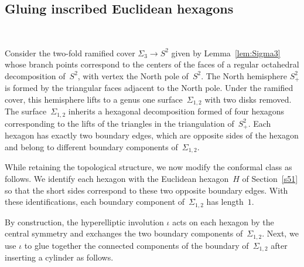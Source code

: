 \documentclass[12pt,reqno]{amsart}
\theoremstyle{definition}
\numberwithin{equation}{section}
\numberwithin{equation}{section}
\begin{document}
\subsection{Gluing inscribed Euclidean hexagons}
\label{s53}

\mbox{ } \medskip



Consider the two-fold ramified cover $\Sigma_3 \to S^2$ given by Lemma~\ref{lem:Sigma3} whose branch points correspond to the centers of the faces of a regular octahedral decomposition of~$S^2$, with vertex the North pole of~$S^2$.
The North hemisphere $S^2_+$ is formed by the triangular faces adjacent
to the North pole.  Under the ramified cover, this hemisphere lifts to a genus
one surface~$\Sigma_{1,2}$ with two disks removed.  The
surface~$\Sigma_{1,2}$ inherits a hexagonal decomposition formed of
four hexagons corresponding to the lifts of the triangles in the
triangulation of~$S^2_+$.  Each hexagon has exactly two boundary
edges, which are opposite sides of the hexagon and belong to different
boundary components of~$\Sigma_{1,2}$.

While retaining the topological structure, we now modify the conformal
class as follows.  We identify each hexagon with the Euclidean
hexagon~$H$ of Section~\ref{s51} so that the short sides correspond to
these two opposite boundary edges.  With these identifications, each
boundary component of~$\Sigma_{1,2}$ has length~$1$.

By construction, the hyperelliptic involution $\iota$ acts on each
hexagon by the central symmetry and exchanges the two boundary
components of~$\Sigma_{1,2}$.
Next, we use $\iota$ to glue together the connected components of the
boundary of~$\Sigma_{1,2}$ after inserting a cylinder as follows.
\end{document}
